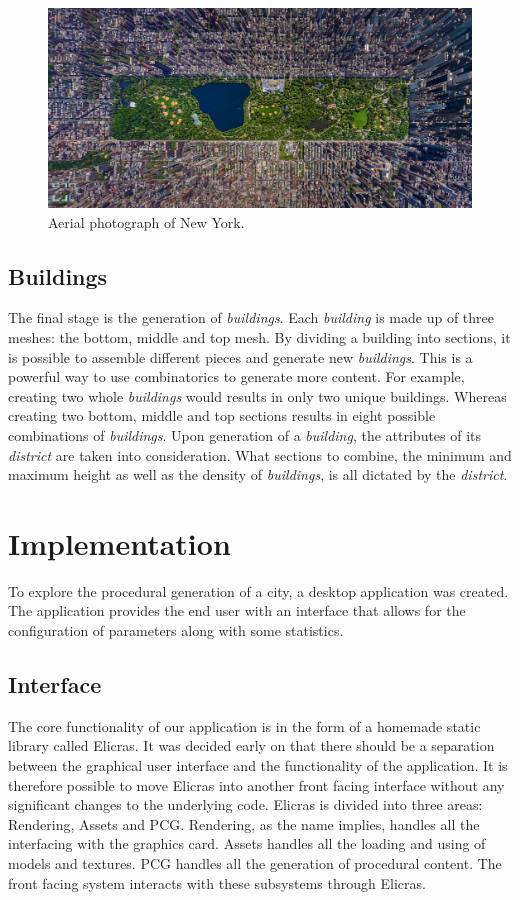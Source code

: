 	\begin{figure}[h]
		\centering
		\includegraphics[width=0.9\linewidth]{"Images/new york"}
		\caption{Aerial photograph of New York.}
		\label{fig:new-york}
	\end{figure}
		
	\subsection{Buildings}
	The final stage is the generation of \textit{buildings}. Each \textit{building} is made up of three meshes: the bottom, middle and top mesh. By dividing a building into sections, it is possible to assemble different pieces and generate new \textit{buildings}. This is a powerful way to use combinatorics to generate more content. For example, creating two whole \textit{buildings} would results in only two unique buildings. Whereas creating two bottom, middle and top sections results in eight possible combinations of \textit{buildings}. Upon generation of a \textit{building}, the attributes of its \textit{district} are taken into consideration. What sections to combine, the minimum and maximum height as well as the density of \textit{buildings}, is all dictated by the \textit{district}.

\section{Implementation}
To explore the procedural generation of a city, a desktop application was created. The application provides the end user with an interface that allows for the configuration of parameters along with some statistics. 
	
	\subsection{Interface}
	The core functionality of our application is in the form of a homemade static library called Elicras. It was decided early on that there should be a separation between the graphical user interface and the functionality of the application. It is therefore possible to move Elicras into another front facing interface without any significant changes to the underlying code. Elicras is divided into three areas: Rendering, Assets and PCG. Rendering, as the name implies, handles all the interfacing with the graphics card. Assets handles all the loading and using of models and textures. PCG handles all the generation of procedural content. The front facing system interacts with these subsystems through Elicras.
		
